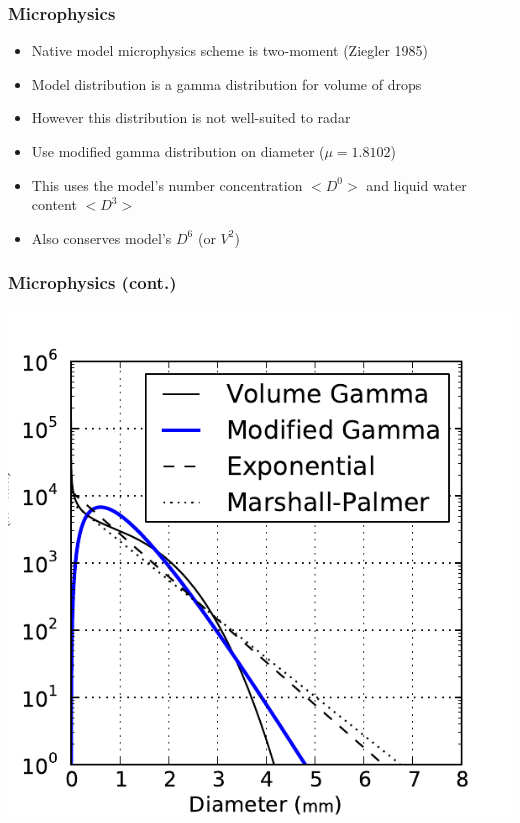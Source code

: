\documentclass[red]{beamer}
\begin{document}
\begin{frame}[<+->]
	\frametitle{Microphysics}
	\begin{itemize}
		\item Native model microphysics scheme is two-moment (Ziegler 1985)
		\item Model distribution is a gamma distribution for volume of drops
		\item However this distribution is not well-suited to radar
		\item Use modified gamma distribution on diameter ($\mu=1.8102$)
		\item This uses the model's number concentration $<D^0>$ and liquid water content $<D^3>$
		\item Also conserves model's $D^6$ (or $V^2$)
	\end{itemize}
\end{frame}

\begin{frame}
	\frametitle{Microphysics (cont.)}
	\begin{center}
		\includegraphics[scale=0.6]{figures/distribution-comparison.pdf}
	\end{center}
\end{frame}
\end{document}
